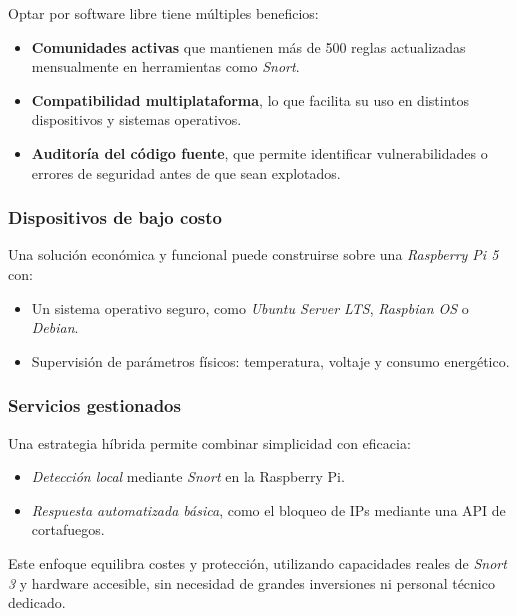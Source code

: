 \documentclass[11pt,a4paper,twoside]{report}
\begin{document}
Optar por software libre tiene múltiples beneficios:

\begin{itemize}
	\item \textbf{Comunidades activas} que mantienen más de 500 reglas actualizadas mensualmente en herramientas como \textit{Snort}.
	\item \textbf{Compatibilidad multiplataforma}, lo que facilita su uso en distintos dispositivos y sistemas operativos.
	\item \textbf{Auditoría del código fuente}, que permite identificar vulnerabilidades o errores de seguridad antes de que sean explotados.
\end{itemize}


\subsubsection{Dispositivos de bajo costo}

Una solución económica y funcional puede construirse sobre una \textit{Raspberry Pi 5} con:

\begin{itemize}
	\item Un sistema operativo seguro, como \textit{Ubuntu Server LTS}, \textit{Raspbian OS} o \textit{Debian}.
	\item Supervisión de parámetros físicos: temperatura, voltaje y consumo energético.
\end{itemize}

\subsubsection{Servicios gestionados}

Una estrategia híbrida permite combinar simplicidad con eficacia:

\begin{itemize}
	\item \textit{Detección local} mediante \textit{Snort} en la Raspberry Pi.
	\item \textit{Respuesta automatizada básica}, como el bloqueo de IPs mediante una API de cortafuegos.
\end{itemize}

Este enfoque equilibra costes y protección, utilizando capacidades reales de \textit{Snort 3} y hardware accesible, sin necesidad de grandes inversiones ni personal técnico dedicado.

\vspace{0.5cm}
\end{document}
